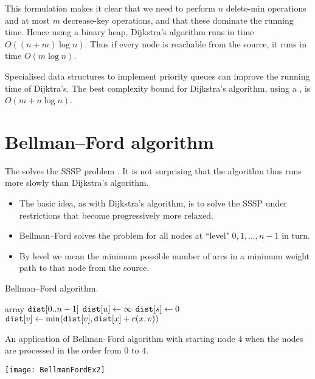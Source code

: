 This formulation makes it clear that we need to perform $n$
delete-min operations and at most $m$ decrease-key operations, and
that these dominate the running time. Hence using a binary heap, Dijkstra's
algorithm runs in time $O((n + m) \log n)$. 
Thus if every node is reachable from the source, it runs in time $O(m \log n)$.

Specialised data structures to implement priority queues can improve the running time of Dijktra's.
The best complexity bound for Dijkstra's algorithm, using a , is $O(m + n\log n)$.

\section{Bellman--Ford algorithm} \label{sec:bellford}
The  solves the SSSP problem . 
It is not surprising that the algorithm thus runs more slowly than Dijkstra's algorithm. 
\begin{itemize}
  \item The basic idea, as with Dijkstra's algorithm, is to solve the SSSP under restrictions that become progressively more relaxed. 
  \item Bellman--Ford solves the problem for all nodes at ``level" $0, 1, \dots , n-1$ in turn.
  \item By level we mean the minimum possible number of arcs in a minimum weight path to that node from the source.
\end{itemize}

\begin{algorithm}[H]
  \caption{Bellman--Ford algorithm.}
  \label{alg:bellford-code}
\begin{algorithmic}[1]
	\State array $\operatorname{\text{\texttt{dist}}}[0..n-1]$
		\State $\operatorname{\text{\texttt{dist}}}[u] \gets \infty$ 
	\EndFor
	\State $\operatorname{\text{\texttt{dist}}}[s] \gets 0$
				\State $\operatorname{\text{\texttt{dist}}}[v] \gets \min( \operatorname{\text{\texttt{dist}}}[v], \operatorname{\text{\texttt{dist}}}[x] + c(x,v) )$
			\EndFor
		\EndFor
	\EndFor
	\State \Return{$\dist$}
\EndFunction
\end{algorithmic}
\end{algorithm}

\begin{Boxample}[0]
An application of Bellman--Ford algorithm with starting node $4$
when the nodes are processed in the order from $0$ to $4$.
\begin{center} 
  \texttt{[image: BellmanFordEx2]}
\end{center}
\end{Boxample}

